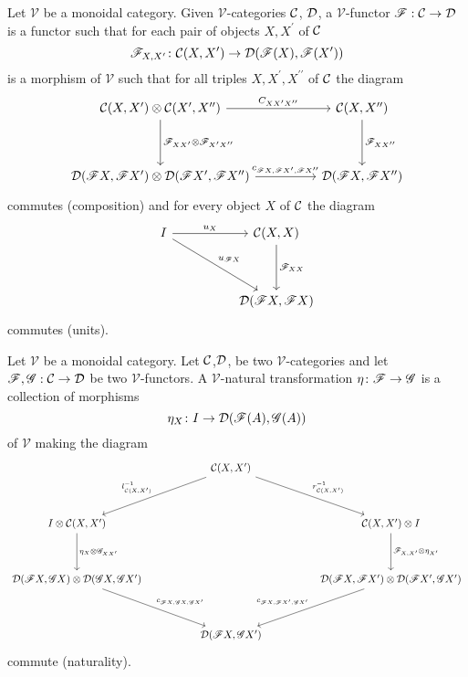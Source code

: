 \documentclass[dissertation.tex]{subfiles}
\begin{document}
\begin{defn}
  Let $\mathscr{V}$ be a monoidal category.
  Given $\mathscr{V}$-categories $\mathcal{C}$, $\mathcal{D}$, a $\mathscr{V}$-functor $\mathscr{F} : \mathcal{C} \to \mathcal{D}$ is a functor such that for each pair of objects $X,X^\prime$ of $\mathcal{C}$
  $$\mathscr{F}_{X,X^\prime} \colon \mathcal{C}(X,X^\prime) \to \mathcal{D}(\mathscr{F}(X),\mathscr{F}(X^\prime))$$
  is a morphism of $\mathscr{V}$
  such that for all triples $X,X^\prime, X^{\prime\prime}$ of $\mathcal{C}$ the diagram
  $$\begin{tikzcd}
    \C(X,X^\prime) \otimes \C(X^\prime, X^{\prime\prime}) \arrow{rr}{C_{XX{^\prime}X^{\prime\prime}}}\arrow{dd}{\F_{XX^\prime} \otimes \F_{X^\prime X^{\prime\prime}}} && \C(X,X^{\prime\prime})\arrow{dd}{\F_{XX^{\prime\prime}}}\\
    \\
    \D(\F X, \F X^\prime) \otimes \D(\F X^\prime, \F X^{\prime\prime}) \arrow{rr}{c_{\F X,\F X^\prime,\F X^{\prime\prime}}}&& \D(\F X, \F X^{\prime\prime})
  \end{tikzcd}$$
  commutes (composition)
  and for every object $X$ of $\mathcal{C}$ the diagram
  $$\begin{tikzcd}
    I \arrow{rr}{u_X}\arrow{rrdd}{u_{\F X}} && \C(X,X)\arrow{dd}{\F_{XX}}\\
    \\
    &&\D(\F X, \F X)
  \end{tikzcd}$$
  commutes (units).
\end{defn}

\begin{defn}\label{VNatDefn}
  Let $\mathscr{V}$ be a monoidal category.
  Let $\mathcal{C}$,$\mathcal{D}$, be two $\mathscr{V}$-categories and let $\mathscr{F},\mathscr{G} : \mathcal{C} \to \mathcal{D}$ be two $\mathscr{V}$-functors.
  A $\mathscr{V}$-natural transformation $\eta \colon \mathscr{F} \to \mathscr{G}$ is a collection of morphisms
  $$\eta_X \colon I \to \mathcal{D}(\mathscr{F}(A), \mathscr{G}(A))$$
  of $\mathscr{V}$ making the diagram
  $$\begin{tikzcd}
    && \C(X,X^\prime) \arrow[swap]{lldd}{l^{-1}_{\C(X,X^\prime)}} \arrow{rrdd}{r^{-1}_{\C(X,X^\prime)}}\\
    \\
    I \otimes \C(X,X^\prime)\arrow{dd}{\eta_X \otimes \G_{XX^\prime}} &&&& \C(X,X^\prime) \otimes I\arrow{dd}{\F_{X,X^\prime} \otimes \eta_{X^\prime}}\\
    \\
    \D(\F X, \G X) \otimes \D(\G X, \G X^\prime) \arrow{rrdd}{c_{\F X, \G X, \G X^\prime}} &&&& \D(\F X, \F X^\prime) \otimes \D(\F X^\prime, \G X^\prime) \arrow[swap]{lldd}{c_{\F X, \F X^\prime, \G X^\prime}}\\
    \\
    && \D(\F X, \G X^\prime)
  \end{tikzcd}$$
  commute (naturality).
\end{defn}
\end{document}
